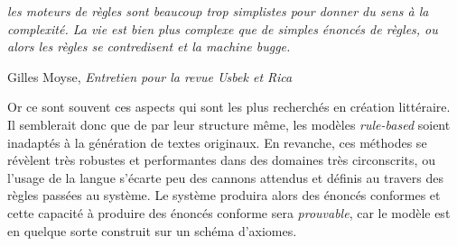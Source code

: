 \documentclass{article}
\newenvironment{citationbox}
{\begin{center}
		\begin{minipage}{.8\textwidth}
		}
		{
		\end{minipage}	
\end{center}
}
\begin{document}
			\begin{citationbox}
				\textit{les moteurs de règles sont beaucoup trop simplistes pour donner du sens à la complexité. La vie est bien plus complexe que de simples énoncés de règles, ou alors les règles se contredisent et la machine bugge.}
				\begin{flushright}
					Gilles Moyse, \textit{Entretien pour la revue Usbek et Rica} \cite{edin2018}
				\end{flushright}
			\end{citationbox}
			
			
			Or ce sont souvent ces aspects qui sont les plus recherchés en création littéraire. Il semblerait donc que de par leur structure même, les modèles \textit{rule-based} soient inadaptés à la génération de textes originaux. En revanche, ces méthodes se révèlent très robustes et performantes dans des domaines très circonscrits, ou l'usage de la langue s'écarte peu des cannons attendus et définis au travers des règles passées au système. Le système produira alors des  énoncés conformes et cette capacité à produire des énoncés conforme sera \textit{prouvable}, car le modèle est en quelque sorte construit sur un schéma d'axiomes.\\
				
\end{document}
